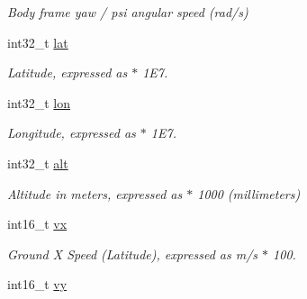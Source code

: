 \begin{DoxyCompactItemize}
\begin{DoxyCompactList}\small\item\em Body frame yaw / psi angular speed (rad/s) \end{DoxyCompactList}\item 
\hypertarget{struct____mavlink__hil__state__quaternion__t_a2e54416e81eb004268570f4250242356}{int32\+\_\+t \hyperlink{struct____mavlink__hil__state__quaternion__t_a2e54416e81eb004268570f4250242356}{lat}}\label{struct____mavlink__hil__state__quaternion__t_a2e54416e81eb004268570f4250242356}

\begin{DoxyCompactList}\small\item\em Latitude, expressed as $\ast$ 1\+E7. \end{DoxyCompactList}\item 
\hypertarget{struct____mavlink__hil__state__quaternion__t_a345f022044f481073ea518e0ac65218a}{int32\+\_\+t \hyperlink{struct____mavlink__hil__state__quaternion__t_a345f022044f481073ea518e0ac65218a}{lon}}\label{struct____mavlink__hil__state__quaternion__t_a345f022044f481073ea518e0ac65218a}

\begin{DoxyCompactList}\small\item\em Longitude, expressed as $\ast$ 1\+E7. \end{DoxyCompactList}\item 
\hypertarget{struct____mavlink__hil__state__quaternion__t_abde8333e57ef71852b1de1529f3f3146}{int32\+\_\+t \hyperlink{struct____mavlink__hil__state__quaternion__t_abde8333e57ef71852b1de1529f3f3146}{alt}}\label{struct____mavlink__hil__state__quaternion__t_abde8333e57ef71852b1de1529f3f3146}

\begin{DoxyCompactList}\small\item\em Altitude in meters, expressed as $\ast$ 1000 (millimeters) \end{DoxyCompactList}\item 
\hypertarget{struct____mavlink__hil__state__quaternion__t_a0c33d3ef8decf225d84201d19b5da35f}{int16\+\_\+t \hyperlink{struct____mavlink__hil__state__quaternion__t_a0c33d3ef8decf225d84201d19b5da35f}{vx}}\label{struct____mavlink__hil__state__quaternion__t_a0c33d3ef8decf225d84201d19b5da35f}

\begin{DoxyCompactList}\small\item\em Ground X Speed (Latitude), expressed as m/s $\ast$ 100. \end{DoxyCompactList}\item 
\hypertarget{struct____mavlink__hil__state__quaternion__t_ae13c1fd1447d434847c4791181e270c1}{int16\+\_\+t \hyperlink{struct____mavlink__hil__state__quaternion__t_ae13c1fd1447d434847c4791181e270c1}{vy}}\label{struct____mavlink__hil__state__quaternion__t_ae13c1fd1447d434847c4791181e270c1}


\end{DoxyCompactItemize}
